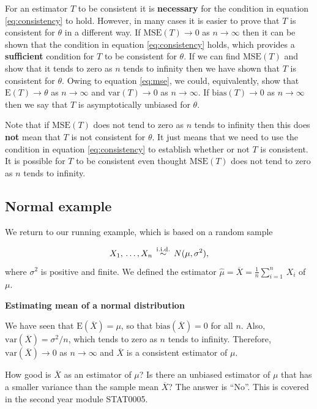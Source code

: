 \documentclass[
  british,
  11pt,
  openany, a4paper]{book}
\begin{document}
For an estimator \(T\) to be consistent it is \textbf{necessary} for the condition in equation \eqref{eq:consistency} to hold. However, in many cases it is easier to prove that \(T\) is consistent for \(\theta\) in a different way. If \(\text{MSE}(T) \rightarrow 0\) as \(n \rightarrow \infty\) then it can be shown that the condition in equation \eqref{eq:consistency} holds, which provides a \textbf{sufficient} condition for \(T\) to be consistent for \(\theta\). If we can find \(\text{MSE}(T)\) and show that it tends to zero as \(n\) tends to infinity then we have shown that \(T\) is consistent for \(\theta\). Owing to equation \eqref{eq:mse}, we could, equivalently, show that \(\text{E}(T) \rightarrow \theta\) as \(n \rightarrow \infty\) and \(\text{var}(T) \rightarrow 0\) as \(n \rightarrow \infty\). If \(\text{bias}(T) \rightarrow 0\) as \(n \rightarrow \infty\) then we say that \(T\) is asymptotically unbiased for \(\theta\).

Note that if \(\text{MSE}(T)\) does not tend to zero as \(n\) tends to infinity then this does \textbf{not} mean that \(T\) is not consistent for \(\theta\). It just means that we need to use the condition in equation \eqref{eq:consistency} to establish whether or not \(T\) is consistent. It is possible for \(T\) to be consistent even thought \(\text{MSE}(T)\) does not tend to zero as \(n\) tends to infinity.

\subsection{Normal example}\label{normalexample}

We return to our running example, which is based on a random sample

\[X_1, \,\ldots,X_n \,\stackrel{{\rm i.i.d.}}{\sim}\, N(\mu,\sigma^2),\]
where \(\sigma^2\) is positive and finite. We defined the estimator \(\hat{\mu}=\overline{X}=\displaystyle\frac{1}{n}\sum_{i=1}^n\,X_i\) of \(\mu\).

\textbf{Estimating mean of a normal distribution}

We have seen that \(\text{E}(\overline{X})=\mu\), so that \(\text{bias}(\overline{X})=0\) for all \(n\). Also, \(\text{var}(\overline{X}) = \sigma^2 / n\), which tends to zero as \(n\) tends to infinity. Therefore, \(\text{var}(\overline{X}) \rightarrow 0\) as \(n \rightarrow \infty\) and \(\overline{X}\) is a consistent estimator of \(\mu\).

How good is \(\overline{X}\) as an estimator of \(\mu\)? Is there an unbiased estimator of \(\mu\) that has a smaller variance than the sample mean \(\overline{X}\)? The answer is ``No''. This is covered in the second year module STAT0005.
\end{document}

